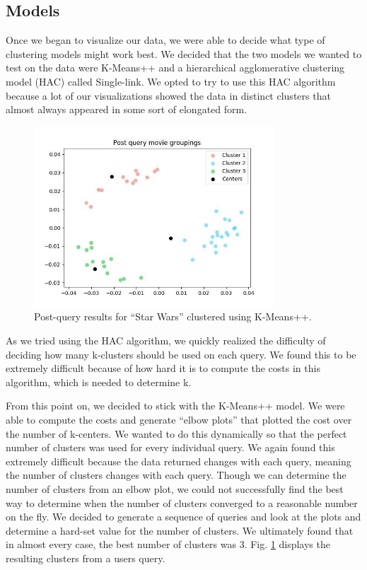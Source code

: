 \documentclass[sigconf]{acmart}
\begin{document}
\subsection{Models}
Once we began to visualize our data, we were able to decide what type of clustering models might work best. We decided that the two models we wanted to test on the data were K-Means++ and a hierarchical agglomerative clustering model (HAC) called Single-link. We opted to try to use this HAC algorithm because a lot of our visualizations showed the data in distinct clusters that almost always appeared in some sort of elongated form.

\begin{figure}[h]
  \centering
  \includegraphics[width=9cm]{images/image1.jpg}
  \caption{Post-query results for ``Star Wars'' clustered using K-Means++.}
  \label{fig:clusters}
\end{figure}

As we tried using the HAC algorithm, we quickly realized the difficulty of deciding how many k-clusters should be used on each query. We found this to be extremely difficult because of how hard it is to compute the costs in this algorithm, which is needed to determine k.

From this point on, we decided to stick with the K-Means++ model. We were able to compute the costs and generate ``elbow plots'' that plotted the cost over the number of k-centers. We wanted to do this dynamically so that the perfect number of clusters was used for every individual query. We again found this extremely difficult because the data returned changes with each query, meaning the number of clusters changes with each query. Though we can determine the number of clusters from an elbow plot, we could not successfully find the best way to determine when the number of clusters converged to a reasonable number on the fly. We decided to generate a sequence of queries and look at the plots and determine a hard-set value for the number of clusters. We ultimately found that in almost every case, the best number of clusters was 3. Fig. \ref{fig:clusters} displays the resulting clusters from a users query.
\end{document}

